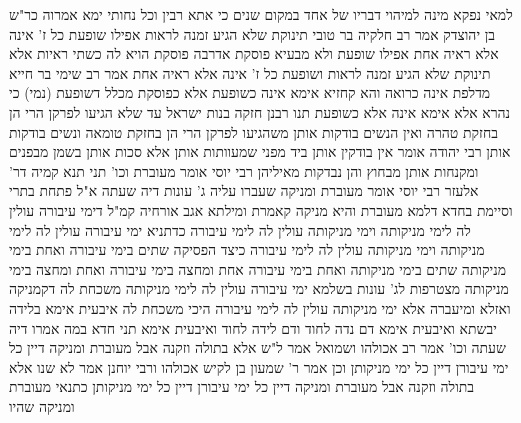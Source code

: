 \documentclass[12pt, openany]{book}
\begin{document}
{למאי נפקא מינה  למיהוי דבריו של אחד במקום שנים 
כי אתא רבין וכל נחותי ימא אמרוה כר"ש בן יהוצדק 
אמר רב חלקיה בר טובי  תינוקת שלא הגיע זמנה לראות אפילו שופעת כל ז' אינה אלא ראיה אחת  אפילו שופעת ולא מבעיא פוסקת  אדרבה פוסקת הויא לה כשתי ראיות 
אלא  תינוקת שלא הגיע זמנה לראות ושופעת כל ז' אינה אלא ראיה אחת 
אמר רב שימי בר חייא  מדלפת אינה כרואה  והא קחזיא  אימא  אינה כשופעת אלא כפוסקת 
מכלל דשופעת (נמי) כי נהרא  אלא אימא  אינה אלא כשופעת 
תנו רבנן  חזקה בנות ישראל עד שלא הגיעו לפרקן הרי הן בחזקת טהרה ואין הנשים בודקות אותן  משהגיעו לפרקן הרי הן בחזקת טומאה ונשים בודקות אותן 
רבי יהודה אומר  אין בודקין אותן ביד מפני שמעוותות אותן אלא סכות אותן בשמן מבפנים ומקנחות אותן מבחוץ והן נבדקות מאיליהן
רבי יוסי אומר מעוברת וכו' תני תנא קמיה דר' אלעזר  רבי יוסי אומר מעוברת ומניקה שעברו עליה ג' עונות דיה שעתה א"ל  פתחת בתרי וסיימת בחדא 
דלמא מעוברת והיא מניקה קאמרת ומילתא אגב אורחיה קמ"ל דימי עיבורה עולין לה לימי מניקותה וימי מניקותה עולין לה לימי עיבורה  כדתניא  ימי עיבורה עולין לה לימי מניקותה וימי מניקותה עולין לה לימי עיבורה 
כיצד הפסיקה שתים בימי עיבורה ואחת בימי מניקותה שתים בימי מניקותה ואחת בימי עיבורה אחת ומחצה בימי עיבורה ואחת ומחצה בימי מניקותה מצטרפות לג' עונות 
בשלמא ימי עיבורה עולין לה לימי מניקותה משכחת לה דקמניקה ואזלא ומיעברה אלא ימי מניקותה עולין לה לימי עיבורה היכי משכחת לה 
איבעית אימא  בלידה יבשתא ואיבעית אימא  דם נדה לחוד ודם לידה לחוד ואיבעית אימא  תני חדא
במה אמרו דיה שעתה וכו' אמר רב  אכולהו
ושמואל אמר  ל"ש אלא בתולה וזקנה אבל מעוברת ומניקה דיין כל ימי עיבורן דיין כל ימי מניקותן 
וכן אמר ר' שמעון בן לקיש  אכולהו ורבי יוחנן אמר  לא שנו אלא בתולה וזקנה אבל מעוברת ומניקה דיין כל ימי עיבורן דיין כל ימי מניקותן  כתנאי מעוברת ומניקה שהיו}
\end{document}
